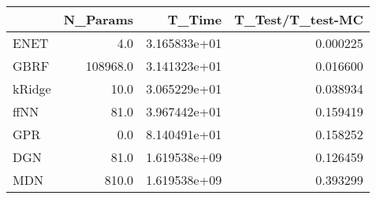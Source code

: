 \begin{tabular}{lrrr}
\toprule
{} &  N\_Params &        T\_Time &  T\_Test/T\_test-MC \\
\midrule
ENET   &       4.0 &  3.165833e+01 &          0.000225 \\
GBRF   &  108968.0 &  3.141323e+01 &          0.016600 \\
kRidge &      10.0 &  3.065229e+01 &          0.038934 \\
ffNN   &      81.0 &  3.967442e+01 &          0.159419 \\
GPR    &       0.0 &  8.140491e+01 &          0.158252 \\
DGN    &      81.0 &  1.619538e+09 &          0.126459 \\
MDN    &     810.0 &  1.619538e+09 &          0.393299 \\
\bottomrule
\end{tabular}
